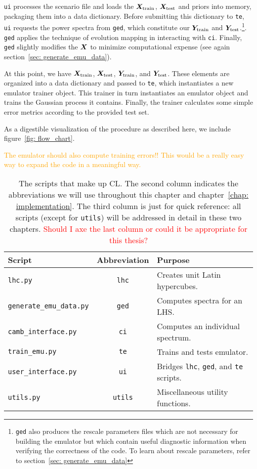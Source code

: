 \texttt{ui} processes the scenario file and loads the
$\bm{X}_\text{train}$, $\bm{X}_\text{test}$
and priors into
memory, packaging them into a data dictionary. Before submitting this
dictionary to \texttt{te}, \texttt{ui} requests the power spectra from
\texttt{ged}, which constitute our $\bm{Y}_\text{train}$ and
$\bm{Y}_\text{test}$.\footnote{\texttt{ged} also 
produces the rescale parameters files which are not
necessary for building the emulator but which contain useful diagnostic
information when verifying the correctness of the code. To learn about rescale
parameters, refer to section~\ref{sec: generate_emu_data}}. \texttt{ged}
applies the technique of evolution mapping in interacting with \texttt{ci}.
Finally, \texttt{ged} slightly modifies the $\bm{X}$ to minimize
computational expense (see again section~\ref{sec: generate_emu_data}). 

At this point, we have $\bm{X}_\text{train}$, $\bm{X}_\text{test}$, 
$\bm{Y}_\text{train}$, and $\bm{Y}_\text{test}$. These elements are
organized into a data dictionary and passed to \texttt{te}, which instantiates
a new emulator trainer object. This trainer in turn instantiates an emulator 
object and trains the Gaussian process it contains. Finally, the trainer 
calculates some simple error metrics according to the provided test set.

As a digestible visualization of the procedure as described here, we
include figure~\ref{fig: flow_chart}.

\textcolor{orange}{The emulator should also compute training errors!! This
would be a really easy way to expand the code in a meaningful way.}

\begin{table}[ht!]
\centering
\begin{tabular}{l|c|l}
\hline
Script & Abbreviation & Purpose \\ \hline
\Verb|lhc.py| & \texttt{lhc} & Creates unit Latin hypercubes. \\
\Verb|generate_emu_data.py| & \texttt{ged} & Computes spectra for an LHS.\\
\Verb|camb_interface.py| & \texttt{ci} & Computes an individual spectrum. \\
\Verb|train_emu.py| & \texttt{te} & Trains and tests emulator. \\
\Verb|user_interface.py| & \texttt{ui} & Bridges
	\texttt{lhc}, \texttt{ged}, and \texttt{te} scripts. \\
\Verb|utils.py| & \texttt{utils} & Miscellaneous utility functions. 
\end{tabular}
 \cprotect\caption[Summary of CL Scripts]{The scripts that make up CL.
 	The second column indicates the abbreviations we will use throughout this 
 	chapter and chapter~\ref{chap: implementation}. The third column is just
 	for quick reference: all scripts (except for \texttt{utils}) will be
 	addressed in detail in these two chapters. \textcolor{red}{Should I axe
 	the last column or could it be appropriate for this thesis?}}
 \label{tab: script_summary}
\end{table}

